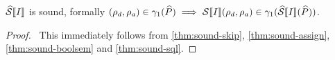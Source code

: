 \begin{conjecture}
    $\widehat{\mathcal{S}} \llbracket I \rrbracket$ is sound, formally $(\rho_d, \rho_a) \in \gamma_1(\widehat{P}) \implies \mathcal{S} \llbracket I \rrbracket(\rho_d, \rho_a) \in \gamma_1(\widehat{\mathcal{S}} \llbracket I \rrbracket(\widehat{P}))$.
\end{conjecture}
\begin{proof}
    \pf\
    This immediately follows from \autoref{thm:sound-skip}, \ref{thm:sound-assign}, \ref{thm:sound-boolsem} and \ref{thm:sound-sql}.
\end{proof}
